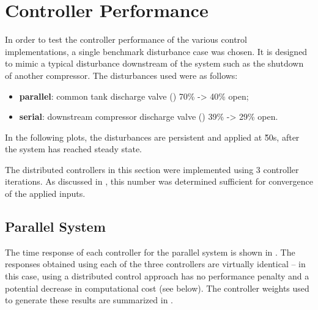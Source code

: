 \section{Controller Performance}
\label{sec:results:performance}

\newif\ifmakeplots
\makeplotstrue


In order to test the controller performance of the various control implementations, a single benchmark disturbance case was chosen.
It is designed to mimic a typical disturbance downstream of the system such as the shutdown of another compressor.
The disturbances used were as follows:

\begin{itemize}
  \item \textbf{parallel}: common tank discharge valve () 70\% -> 40\% open;
  \item \textbf{serial}: downstream compressor discharge valve () 39\% -> 29\% open.
\end{itemize}
In the following plots, the disturbances are persistent and applied at \u{50}{s}, after the system has reached steady state.

The distributed controllers in this section were implemented using 3 controller iterations. 
As discussed in , this number was determined sufficient for convergence of the applied inputs.


\subsection{Parallel System}
\label{sec:results:performance:parallel}


The time response of each controller for the parallel system is shown in .
The responses obtained using each of the three controllers are virtually identical -- in this case, using a distributed control approach has no performance penalty and a potential decrease in computational cost (see below).
The controller weights used to generate these results are summarized in .

